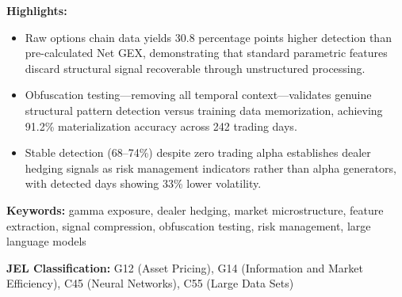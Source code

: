 \documentclass[12pt,letterpaper]{article}
\begin{document}
\medskip
\noindent\textbf{Highlights:}
\begin{itemize}
    \item Raw options chain data yields 30.8 percentage points higher detection than pre-calculated Net GEX, demonstrating that standard parametric features discard structural signal recoverable through unstructured processing.
    \item Obfuscation testing---removing all temporal context---validates genuine structural pattern detection versus training data memorization, achieving 91.2\% materialization accuracy across 242 trading days.
    \item Stable detection (68--74\%) despite zero trading alpha establishes dealer hedging signals as risk management indicators rather than alpha generators, with detected days showing 33\% lower volatility.
\end{itemize}

\medskip
\noindent\textbf{Keywords:} gamma exposure, dealer hedging, market microstructure, feature extraction, signal compression, obfuscation testing, risk management, large language models

\medskip
\noindent\textbf{JEL Classification:} G12 (Asset Pricing), G14 (Information and Market Efficiency), C45 (Neural Networks), C55 (Large Data Sets)








\end{document}
